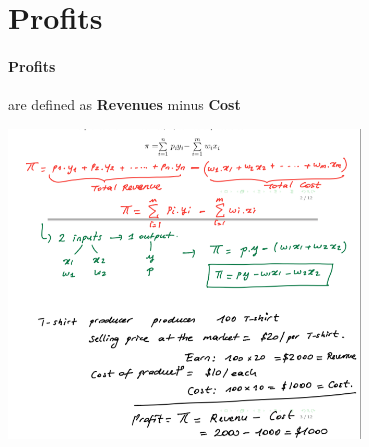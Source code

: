 \documentclass{report}
\begin{document}
\section{Profits}
\begin{defbox}
\paragraph{Profits}
are defined as \textbf{Revenues} minus \textbf{Cost}
\end{defbox}
\includegraphics[width = 0.7\textwidth]{econ9}
\end{document}

